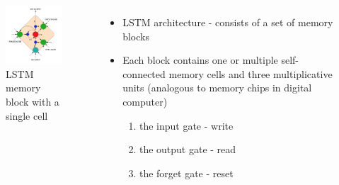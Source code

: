 \documentclass{beamer}
\begin{document}
{
	\begin{columns}
		\begin{figure}[ht]  
			\begin{center}
				\includegraphics[width=2.1in]{Images/LSTM.png}   
			\end{center}   
			\caption{\centering LSTM memory block with a single cell}
		\end{figure}
		\begin{itemize}
		\item LSTM architecture - consists of a set of memory blocks	
		\item Each block contains one or multiple self-connected memory cells and three multiplicative units	(analogous to memory chips in digital computer)
			\begin{enumerate}
			\item the input gate - write
			\item the output gate - read
			\item the forget gate - reset
			\end{enumerate}
		\end{itemize}
	\end{columns}
}
\frame
\end{document}
